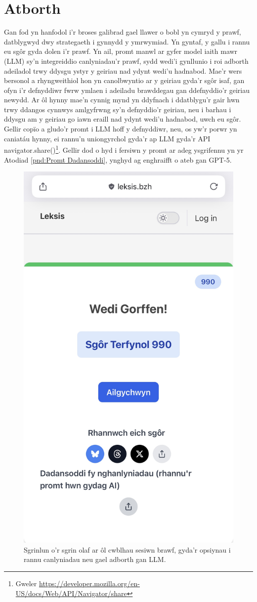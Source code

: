 \section{Atborth}
Gan fod yn hanfodol i'r broses galibrad gael llawer o bobl yn cymryd y prawf, datblygwyd dwy strategaeth i gynnydd y ymrwymiad. Yn gyntaf, y gallu i rannu eu sgôr gyda dolen i'r prawf. Yn ail, promt manwl ar gyfer model iaith mawr (LLM) sy'n integreiddio canlyniadau'r prawf, sydd wedi'i gynllunio i roi adborth adeiladol trwy ddysgu ystyr y geiriau nad ydynt wedi'u hadnabod. Mae'r wers bersonol a rhyngweithiol hon yn canolbwyntio ar y geiriau gyda'r sgôr isaf, gan ofyn i'r defnyddiwr fwrw ymlaen i adeiladu brawddegau gan ddefnyddio'r geiriau newydd. Ar ôl hynny mae'n cynnig mynd yn ddyfnach i ddatblygu'r gair hwn trwy ddangos cynnwys amlgyfrwng sy'n defnyddio'r geiriau, neu i barhau i ddysgu am y geiriau go iawn eraill nad ydynt wedi'u hadnabod, uwch eu sgôr. Gellir copïo a gludo'r promt i LLM hoff y defnyddiwr, neu, os yw'r porwr yn caniatáu hynny, ei rannu'n uniongyrchol gyda'r ap LLM gyda'r API navigator.share()\footnote{Gweler \url{https://developer.mozilla.org/en-US/docs/Web/API/Navigator/share}}. Gellir dod o hyd i fersiwn y promt ar adeg ysgrifennu yn yr Atodiad \ref{pnd:Promt Dadansoddi}, ynghyd ag enghraifft o ateb gan GPT-5.
\begin{figure}[htbp]
    \centering
    \includegraphics[height=0.7\textwidth]{figures/end-screen.jpg}
    \caption{Sgrinlun o'r sgrin olaf ar ôl cwblhau sesiwn brawf, gyda'r opsiynau i rannu canlyniadau neu gael adborth gan LLM.}
\end{figure}\label{fig:endscreen}

